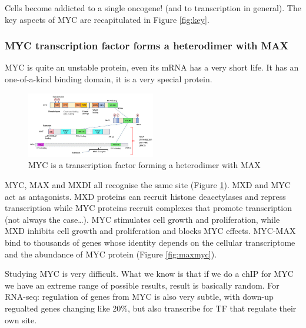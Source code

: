 Cells become addicted to a single oncogene! (and to transcription in general). The key aspects of MYC are recapitulated in Figure \ref{fig:key}.

\hypertarget{myc-transcription-factor-forms-a-heterodimer-with-max}{%
\subsubsection{MYC transcription factor forms a heterodimer with MAX}\label{myc-transcription-factor-forms-a-heterodimer-with-max}}

MYC is quite an unstable protein, even its mRNA has a very short life. It has an one-of-a-kind binding domain, it is a very special protein.

\begin{figure}
\centering
\includegraphics[width=0.5\textwidth]{../_resources/01adbb32a69ee3baec1bf9bddd890f52.png}
\caption{ MYC is a transcription factor forming a heterodimer with MAX}
\label{fig:myc}
\end{figure}

MYC, MAX and MXDI all recognise the same site (Figure \ref{fig:myc}).
MXD and MYC act as antagonists. MXD proteins can recruit histone deacetylases and repress transcription while MYC proteins recruit complexes that promote transcription (not always the case\ldots). MYC stimulates cell growth and proliferation, while MXD inhibits cell growth and proliferation and blocks MYC effects.
MYC-MAX bind to thousands of genes whose identity depends on the cellular transcriptome and the abundance of MYC protein (Figure \ref{fig:maxmyc}).


Studying MYC is very difficult. What we know is that if we do a chIP for MYC we have an extreme range of possible results, result is basically random. For RNA-seq: regulation of genes from MYC is also very subtle, with down-up regualted genes changing like 20\%, but also transcribe for TF that regulate their own site.

